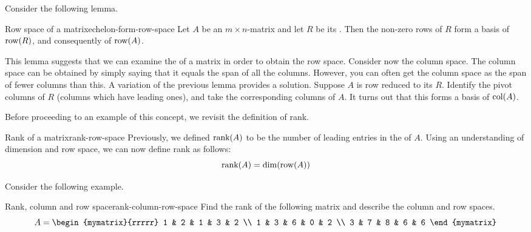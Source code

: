 Consider the following lemma.

\begin{lemma}{Row space of a {\ef} matrix}{echelon-form-row-space}
  Let $A$ be an $m \times n$-matrix and let $R$ be its {\ef}. Then the
  non-zero rows of $R$ form a basis of $\row(R)$, and
  consequently of $\row(A)$.
\end{lemma}

This lemma suggests that we can examine the {\ef} of a matrix in order
to obtain the row space. Consider now the column space. The column
space can be obtained by simply saying that it equals the span of all
the columns. However, you can often get the column space as the span
of fewer columns than this. A variation of the previous lemma provides
a solution. Suppose $A$ is row reduced to its {\ef} $R$. Identify the
pivot columns of $R$ (columns which have leading ones), and take the
corresponding columns of $A$. It turns out that this forms a basis of
$\col(A)$.

Before proceeding to an example of this concept, we revisit the
definition of rank.

\begin{definition}{Rank of a matrix}{rank-row-space}
  Previously, we defined $\mbox{\rm rank}(A)$ to be the number of leading
  entries in the {\ef} of $A$. Using an understanding of dimension and
  row space, we can now define rank as follows:
  \begin{equation*}
    \mbox{rank}(A) = \dim(\row(A))
  \end{equation*}
\end{definition}

Consider the following example.

\begin{example}{Rank, column and row space}{rank-column-row-space}
  Find the rank of the following matrix and describe the column and
  row spaces.
  \begin{equation*}
    A =
    \begin{mymatrix}{rrrrr}
      1 & 2 & 1 & 3 & 2 \\
      1 & 3 & 6 & 0 & 2 \\
      3 & 7 & 8 & 6 & 6
    \end{mymatrix}
  \end{equation*}
\end{example}


